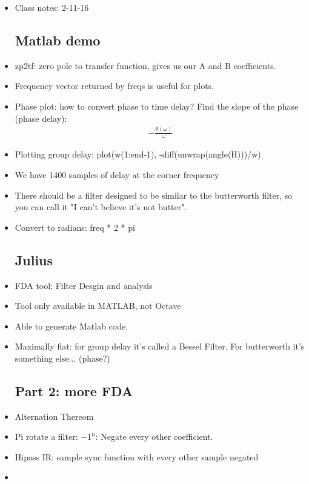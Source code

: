 \begin{itemize}
\item{Class notes: 2-11-16}
\subsection*{Matlab demo}

\item{
zp2tf: zero pole to transfer function, gives us our A and B coefficients.
}

\item{
Frequency vector returned by freqs is useful for plots. 
}

\item{
Phase plot: how to convert phase to time delay? Find the slope of the phase (phase delay):
\begin{align*}
-\frac{\theta(\omega)}{\omega}
\end{align*} 
}

\item{
Plotting group delay: plot(w(1:end-1), -diff(unwrap(angle(H)))/w)
}

\item{
We have 1400 samples of delay at the corner frequency
}

\item{
There should be a filter designed to be similar to the butterworth filter, so you can
call it "I can't believe it's not butter".
}

\item{
Convert to radians: freq * 2 * pi
}

\subsection*{Julius}
\item{
FDA tool: Filter Desgin and analysis
}

\item{
Tool only available in MATLAB, not Octave
}

\item{
Able to generate Matlab code.
}

\item{
Maximally flat: for group delay it's called a Bessel Filter. For butterworth it's something else... (phase?)
}

\subsection*{Part 2: more FDA}
\item{
Alternation Thereom
}

\item{
Pi rotate a filter: $-1^{n}$: Negate every other coefficient.
}

\item{
Hipass IR: sample sync function with every other sample negated
}

\item{

}

\end{itemize}
